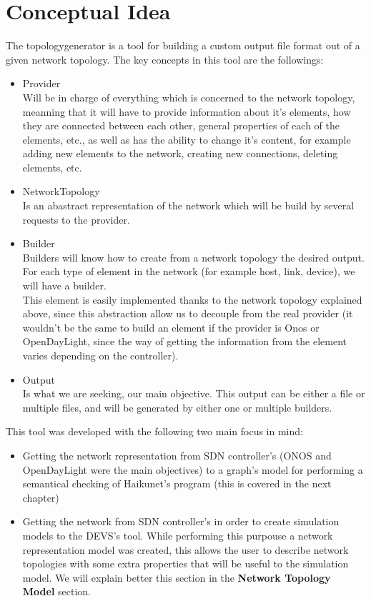 \section{Conceptual Idea}

The topologygenerator is a tool for building a custom output file format out of a given network topology. The key concepts in this tool are the followings:
\begin{itemize}
\item Provider \\
Will be in charge of everything which is concerned to the network topology, meanning that it will have to provide information about it's elements, how they are connected between each other, general properties of each of the elements, etc., as well as has the ability to change it's content, for example adding new elements to the network, creating new connections, deleting elements, etc.
\item NetworkTopology \\
Is an abastract representation of the network which will be build by several requests to the provider.
\item Builder \\
Builders will know how to create from a network topology the desired output. For each type of element in the network (for example host, link, device), we will have a builder.\\
This element is easily implemented thanks to the network topology explained above, since this abstraction allow us to decouple from the real provider (it wouldn't be the same to build an element if the provider is Onos or OpenDayLight, since the way of getting the information from the element varies depending on the controller). \\
\item Output \\
Is what we are seeking, our main objective. This output can be either a file or multiple files, and will be generated by either one or multiple builders.
\end{itemize}

This tool was developed with the following two main focus in mind:

\begin{itemize}
\item Getting the network representation from SDN controller's (ONOS and OpenDayLight were the main objectives) to a graph's model for performing a semantical checking of Haikunet's program (this is covered in the next chapter)
\item Getting the network from SDN controller's in order to create simulation models to the DEVS's tool. While performing this purpouse a network representation model was created, this allows the user to describe network topologies with some extra properties that will be useful to the simulation model. We will explain better this section in the \textbf{Network Topology Model} section.
\end{itemize}

